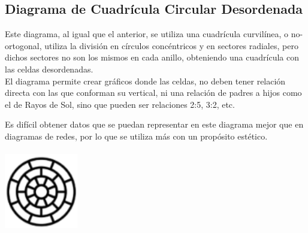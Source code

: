 \documentclass{article}\usepackage[]{graphicx}\usepackage[]{color}
\begin{document}
\subsection{Diagrama de Cuadr\'icula Circular Desordenada}
Este diagrama, al igual que el anterior, se utiliza una cuadr\'icula curvil\'inea, o no-ortogonal\cite{grid-book}, utiliza la divisi\'on en c\'irculos conc\'entricos y en sectores radiales, pero dichos sectores no son los mismos en cada anillo, obteniendo una cuadr\'icula con las celdas desordenadas.~\\
El diagrama permite crear gr\'aficos donde las celdas, no deben tener relaci\'on directa con las que conforman su vertical, ni una relaci\'on de padres a hijos como el de Rayos de Sol, sino que pueden ser relaciones 2:5, 3:2, etc.~\par
Es dif\'icil obtener datos que se puedan representar en este diagrama mejor que en diagramas de redes, por lo que se utiliza m\'as con un prop\'osito est\'etico.
~\\~\\
\vbox{
    \centering
    \includegraphics[width=0.24\textwidth]{imag/cu_des}
}
\end{document}
